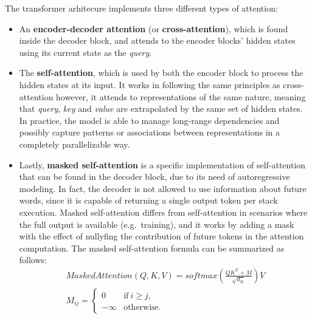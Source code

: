 The transformer arhitecure implements three different types of attention:
\begin{itemize}
    \item An \textbf{encoder-decoder attention} (or \textbf{cross-attention}), which is found inside the decoder block, and attends to the encoder blocks' hidden states using its current state as the \textit{query}.
    \item The \textbf{self-attention}, which is used by both the encoder block to process the hidden states at its input.
It works in following the same principles as cross-attention however, it attends to representations of the same nature, meaning that \textit{query}, \textit{key} and \textit{value} are extrapolated by the same set of hidden states.
In practice, the model is able to manage long-range dependencies and possibly capture patterns or associations between representations in a completely parallelizable way.
    \item Lastly, \textbf{masked self-attention} is a specific implementation of self-attention that can be found in the decoder block, due to its need of autoregressive modeling.
In fact, the decoder is not allowed to use information about future words, since it is capable of returning a single output token per stack execution.
Masked self-attention differs from self-attention in scenarios where the full output is available (e.g.\ training), and it works by adding a mask with the effect of nullyfing the contribution of future tokens in the attention computation.
The masked self-attention formula can be summarized as follows:
\begin{equation}
    \begin{gathered}
        MaskedAttention(Q,K,V) = softmax\left(\frac{QK^\mathrm{T} + M}{\sqrt{d_K}}\right)V \\
        M_{ij} = \begin{cases}
            0 & \text{if}\ i \ge j, \\
            -\infty & \text{otherwise}.
        \end{cases}
    \end{gathered}
\end{equation}
\end{itemize}

